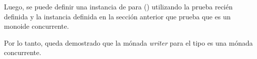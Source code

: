 Luego, se puede definir una instancia de  para  () utilizando la prueba recién definida y la instancia  definida en la sección anterior que prueba que  es un monoide concurrente.

Por lo tanto, queda demostrado que la mónada \textit{writer} para el tipo  es una mónada concurrente.   

